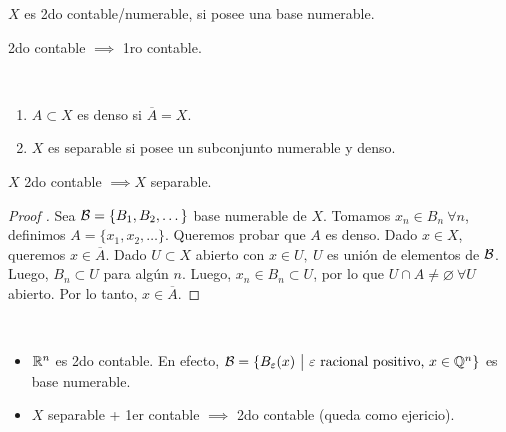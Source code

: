 \begin{definition}
	$X$ es 2do contable/numerable, si posee una base numerable.
\end{definition}

\begin{remark}
	2do contable $\implies$ 1ro contable.
\end{remark}

\begin{definition}~
	\begin{enumerate}[1)]
		\item $A \subset X$ es denso si $\overline{A} = X$.

		\item $X$ es separable si posee un subconjunto numerable y denso.
	\end{enumerate}
\end{definition}

\begin{lemma}
	$X$ 2do contable $\implies X$ separable.
\end{lemma}
\begin{proof}[Proof ]
	Sea $\mathcal{B} = \{B_{1},B_{2},\dots\}$ base numerable de $X$. Tomamos $x_{n} \in B_{n} \ \forall n$, definimos $A = \{x_{1},x_{2},\dots\}$. Queremos probar que $A$ es denso. Dado $x \in X$, queremos $x \in \overline{A}$. Dado $U \subset X$ abierto con $x \in U,\ U$ es unión de elementos de $\mathcal{B}$. Luego, $B_{n} \subset U$ para algún $n$. Luego, $x_{n} \in B_{n} \subset U$, por lo que $U \cap A \neq \varnothing \ \forall U$ abierto. Por lo tanto, $x \in \overline{A}$.
\end{proof}

\begin{eg}~
	\begin{itemize}
		\item $\mathbb{R}^n$ es 2do contable. En efecto, $\mcal{B} = \{B_{\varepsilon}(x) \ \big| \ \varepsilon \text{ racional positivo, } x \in \Q^n\}$ es base numerable. 

		\item $X$ separable + 1er contable $\implies$ 2do contable (queda como ejericio).
	\end{itemize}
\end{eg}

